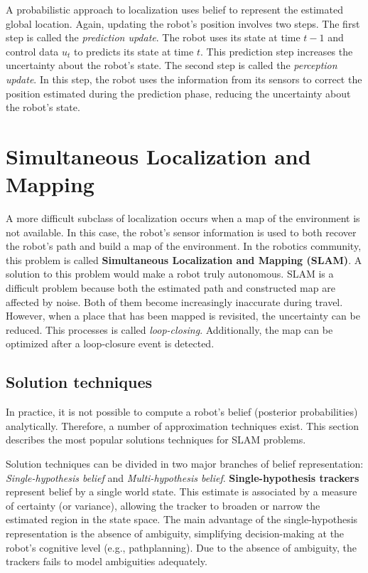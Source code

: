 A probabilistic approach to localization uses belief to represent the estimated global location.
Again, updating the robot's position involves two steps.
The first step is called the \textit{prediction update}.
The robot uses its state at time $t - 1$ and control data $u_t$ to predicts its state at time $t$.
This prediction step increases the uncertainty about the robot's state.
The second step is called the \textit{perception update}.  
In this step, the robot uses the information from its sensors to correct the position estimated during the prediction phase, reducing the uncertainty about the robot's state.

\section{Simultaneous Localization and Mapping}
\label{sec:probabilistic-robotics-slam}

A more difficult subclass of localization occurs when a map of the environment is not available.
In this case, the robot's sensor information is used to both recover the robot's path and build a map of the environment.
In the robotics community, this problem is called \textbf{Simultaneous Localization and Mapping (SLAM)}.
A solution to this problem would make a robot truly autonomous.
SLAM is a difficult problem because both the estimated path and constructed map are affected by noise.
Both of them become increasingly inaccurate during travel.
However, when a place that has been mapped is revisited, the uncertainty can be reduced.
This processes is called \textit{loop-closing}.
Additionally, the map can be optimized after a loop-closure event is detected.


\subsection{Solution techniques}
\label{sec:background-solution-techniques}
In practice, it is not possible to compute a robot's belief (posterior probabilities) analytically.
Therefore, a number of approximation techniques exist. 
This section describes the most popular solutions techniques for SLAM problems.

Solution techniques can be divided in two major branches of belief representation: \textit{Single-hypothesis belief} and \textit{Multi-hypothesis belief}.
\textbf{Single-hypothesis trackers} represent belief by a single world state.
This estimate is associated by a measure of certainty (or variance), allowing the tracker to broaden or narrow the estimated region in the state space.
The main advantage of the single-hypothesis representation is the absence of ambiguity, simplifying decision-making at the robot's cognitive level (e.g., pathplanning).
Due to the absence of ambiguity, the trackers fails to model ambiguities adequately.

